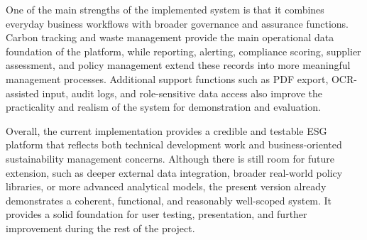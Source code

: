 \documentclass[10pt,a4paper]{article}
\begin{document}
One of the main strengths of the implemented system is that it combines everyday business workflows with broader governance and assurance functions. Carbon tracking and waste management provide the main operational data foundation of the platform, while reporting, alerting, compliance scoring, supplier assessment, and policy management extend these records into more meaningful management processes. Additional support functions such as PDF export, OCR-assisted input, audit logs, and role-sensitive data access also improve the practicality and realism of the system for demonstration and evaluation.

Overall, the current implementation provides a credible and testable ESG platform that reflects both technical development work and business-oriented sustainability management concerns. Although there is still room for future extension, such as deeper external data integration, broader real-world policy libraries, or more advanced analytical models, the present version already demonstrates a coherent, functional, and reasonably well-scoped system. It provides a solid foundation for user testing, presentation, and further improvement during the rest of the project.
\end{document}
